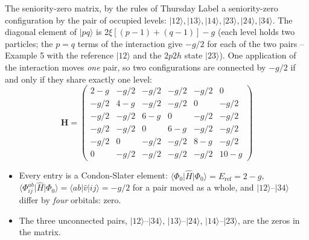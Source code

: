 \documentclass[aspectratio=169,10pt]{beamer}
\newcommand{\ket}[1]{\vert #1\rangle}
\newcommand{\element}[3]{\langle #1\vert #2\vert #3\rangle}
\begin{document}
\begin{frame}{The seniority-zero matrix, by the rules of Thursday}
  \small
  Label a seniority-zero configuration by the pair of occupied levels: $\ket{12},\ket{13},\ket{14},\ket{23},\ket{24},\ket{34}$. The diagonal element of $\ket{pq}$ is $2\xi[(p-1)+(q-1)]-g$ (each level holds two particles; the $p=q$ terms of the interaction give $-g/2$ for each of the two pairs -- Example 5 with the reference $\ket{12}$ and the $2p2h$ state $\ket{23}$). One application of the interaction moves \emph{one} pair, so two configurations are connected by $-g/2$ if and only if they share exactly one level:
  \[
    \bm{H}=
    \begin{pmatrix}
      2-g & -g/2 & -g/2 & -g/2 & -g/2 & 0\\
      -g/2 & 4-g & -g/2 & -g/2 & 0 & -g/2\\
      -g/2 & -g/2 & 6-g & 0 & -g/2 & -g/2\\
      -g/2 & -g/2 & 0 & 6-g & -g/2 & -g/2\\
      -g/2 & 0 & -g/2 & -g/2 & 8-g & -g/2\\
      0 & -g/2 & -g/2 & -g/2 & -g/2 & 10-g
    \end{pmatrix}
  \]
  \begin{itemize}
    \item Every entry is a Condon-Slater element: $\element{\Phi_0}{\hat{H}}{\Phi_0}=E_{\mathrm{ref}}=2-g$, $\element{\Phi_{ij}^{ab}}{\hat{H}}{\Phi_0}=\element{ab}{\hat{v}}{ij}=-g/2$ for a pair moved as a whole, and $\ket{12}$--$\ket{34}$ differ by \emph{four} orbitals: zero.
    \item The three unconnected pairs, $\ket{12}$--$\ket{34}$, $\ket{13}$--$\ket{24}$, $\ket{14}$--$\ket{23}$, are the zeros in the matrix.
  \end{itemize}
\end{frame}
\end{document}
